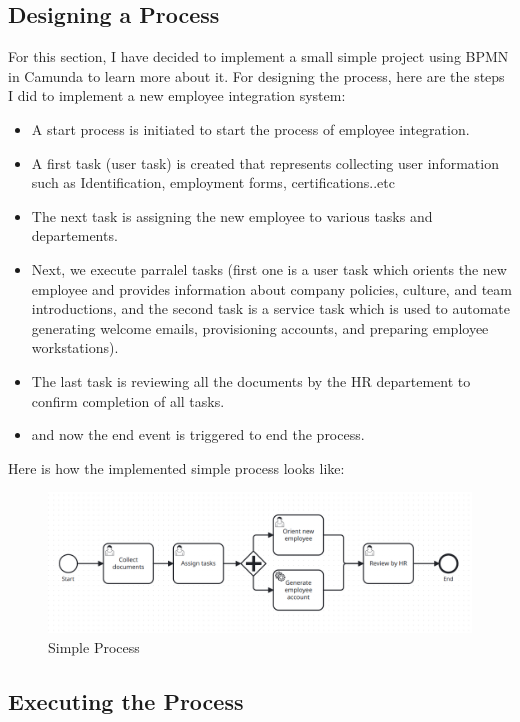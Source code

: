 \documentclass[12pt]{article}
\begin{document}
{  \subsection{Designing a Process}
  
For this section, I have decided to implement a small simple project using BPMN in Camunda to learn more about it.
For designing the process, here are the steps I did to implement a new employee integration system:

\begin{itemize}
  \item A start process is initiated to start the process of employee integration.
  \item A first task (user task) is created that represents collecting user information such as Identification, employment forms, certifications..etc
  \item The next task is assigning the new employee to various tasks and departements.
  \item Next, we execute parralel tasks (first one is a user task which orients the new employee and provides information about company policies, culture, and team introductions, and the second task is a service task which is used to automate generating welcome emails, provisioning accounts, and preparing employee workstations).
  \item The last task is reviewing all the documents by the HR departement to confirm completion of all tasks.
  \item and now the end event is triggered to end the process.
\end{itemize}

\pagebreak

Here is how the implemented simple process looks like:

\begin{figure}[h]
    \centering
    \includegraphics[width=.90\linewidth]{simple_process.png}
    \caption{Simple Process}
    \label{fig:simple_process}
\end{figure}

  \subsection{Executing the Process}

}
\end{document}
